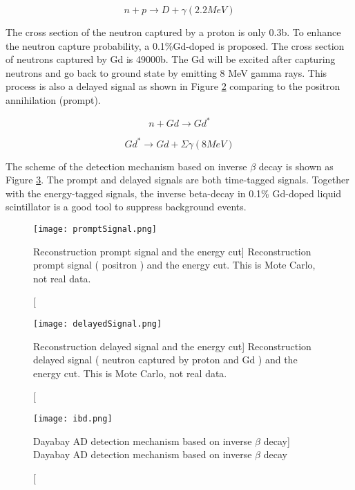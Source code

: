 \begin{equation}
n + p \rightarrow D + \gamma (2.2 MeV)
\label{NeutronPCapture}
\end{equation}


The cross section of the neutron captured by a proton is only 0.3b.
To enhance the neutron capture probability, a 0.1\%Gd-doped
is proposed. The cross section of neutrons captured by Gd is 49000b. The Gd will be excited
after capturing neutrons and go back to ground state by emitting 8 MeV gamma rays. This
process is also a delayed signal as shown in Figure \ref{fig:delayedSignal} comparing to the positron annihilation (prompt).


\begin{equation}
n + Gd \rightarrow Gd^*
\label{NeutronGdCapture}
\end{equation}


\begin{equation}
Gd^* \rightarrow Gd + \Sigma \gamma (8 MeV)
\label{GdStarToGd}
\end{equation}


The scheme of the detection mechanism based on inverse $\beta$ decay is shown as Figure \ref{fig:ibd}.
The prompt and delayed signals are both time-tagged signals.
Together with the energy-tagged signals, the inverse beta-decay
in 0.1\% Gd-doped liquid scintillator is a good tool to suppress
background events.


\begin{figure}
    \centering
    \texttt{[image: promptSignal.png]}
    \caption
    [Reconstruction prompt signal and the energy cut]
    {Reconstruction prompt signal ( positron ) and the energy cut. This is Mote Carlo, not real data.}
    \label{fig:promptSignal}
    \end{figure}

\begin{figure}
    \centering
    \texttt{[image: delayedSignal.png]}
    \caption
    [Reconstruction delayed signal and the energy cut]
    {Reconstruction delayed signal ( neutron captured by proton and Gd ) and the energy cut. This is Mote Carlo, not real data.}
    \label{fig:delayedSignal}
    \end{figure}



\begin{figure}
    \centering
    \texttt{[image: ibd.png]}
    \caption
    [Dayabay AD detection mechanism based on inverse $\beta$ decay]
    {Dayabay AD detection mechanism based on inverse $\beta$ decay}
    \label{fig:ibd}
    \end{figure}


